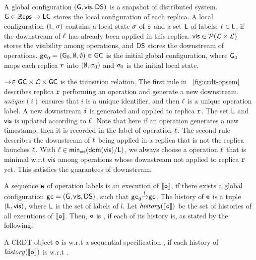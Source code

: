 A global configuration $(\mathsf{G}, \mathsf{vis}, \mathsf{DS})$ is a snapshot of distributed system. $\mathsf{G} \in \mathbb{R}\mathsf{eps} \rightarrow \mathsf{LC}$ stores the local configuration of each replica. A local configuration $(\mathsf{L}, \sigma)$ contains a local state $\sigma$ of $\mathtt{o}$ and a set $\mathsf{L}$ of labels: $\ell \in \mathsf{L}$, if the downstream of $\ell$ has already been applied in this replica. $\mathsf{vis} \in \mathcal{P}(\mathcal{L} \times \mathcal{L})$ stores the visibility among operations, and $\mathsf{DS}$ stores the downstream of operations. $\mathtt{gc}_0 = (\mathsf{G}_0, \emptyset, \emptyset) \in \mathsf{GC}$ is the initial global configuration, where $\mathsf{G}_0$ maps each replica $\mathtt{r}$ into $(\emptyset, \sigma_0)$ and $\sigma_0$ is the initial local state. 

$\rightarrow \in \mathsf{GC} \times \mathcal{L} \times \mathsf{GC}$ is the transition relation. The first rule in \figurename~\ref{fig:crdt-opsem} describes replica $\mathtt{r}$ performing an operation and generate a new downstream. $\mathit{unique}(i)$ ensures that $i$ is a unique identifier, and then $\ell$ is a unique operation label. A new downstream $\delta$ is generated and applied to replica $\mathtt{r}$. The set $\mathsf{L}$ and $\mathsf{vis}$ is updated according to $\ell$. Note that here if an operation generates a new timestamp, then it is recorded in the label of operation $\ell$. The second rule describes the downstream of $\ell$ being applied in a replica that is not the replica launches $\ell$. With $\ell \in \mathsf{min}_{\mathsf{vis}}(\mathsf{dom}(\mathsf{vis}) / \mathsf{L})$, we always choose a operation $\ell$ that is minimal w.r.t $\mathsf{vis}$ among operations whose downstream not applied to replica $\mathtt{r}$ yet. This satisfies the guarantees of downstream.


A sequence $\mathtt{e}$ of operation labels is an execution of $\llbracket \mathtt{o} \rrbracket$, if there exists a global configuration $\mathtt{gc} = (\mathsf{G}, \mathsf{vis}, \mathsf{DS})$, such that $\mathtt{gc}_0 {\xrightarrow{ l }} \mathtt{gc}$. The history of $\mathtt{e}$ is a tuple $(\mathsf{L}, \mathsf{vis})$, where $\mathsf{L}$ is the set of labels of $l$. Let $\mathit{history}(\llbracket \mathtt{o} \rrbracket)$ be the set of histories of all executions of $\llbracket \mathtt{o} \rrbracket$. Then, $\mathtt{o}$ is \crdtlinearizable{}, if each of its history is, as stated by the following:

\begin{definition}
\label{definition:correctness of a CRDT object}
A CRDT object $\mathtt{o}$ is \crdtlinearizable{} w.r.t a sequential specification \Spec{}, if each history of $\mathit{history}(\llbracket \mathtt{o} \rrbracket)$ is \crdtlinearizable{} w.r.t \Spec{}.
\end{definition}

















